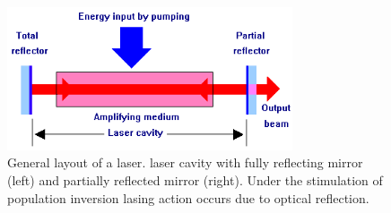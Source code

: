 \begin{figure}[ht!]
\centering
\includegraphics[width=0.75\textwidth]{chapters/img/laser_cavity.PNG}
\caption{General layout of a \acs{laser}. \acs{laser} cavity with fully reflecting mirror (left) and partially reflected mirror (right). Under the stimulation of population inversion lasing action occurs due to optical reflection.}
\label{fig:laser_cavity}
\end{figure}

